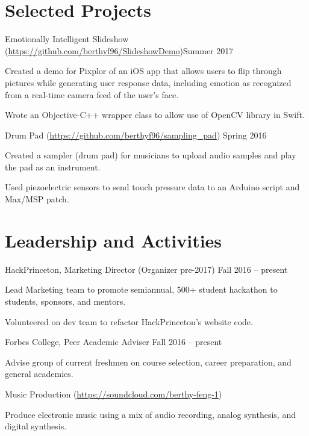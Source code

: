 \documentclass[12pt]{my_resume}
\begin{document}
\section{Selected Projects}

\begin{resitem}{Emotionally Intelligent Slideshow %
(\url{https://github.com/berthyf96/SlideshowDemo})}{Summer 2017}
  \item Created a demo for Pixplor of an iOS app that allows users to %
  flip through pictures while generating user response data, including %
  emotion as recognized from a real-time camera feed of the user’s face.
  \item Wrote an Objective-C++ wrapper class to allow use of OpenCV %
  library in Swift.
\end{resitem}

\vspace{-8pt}

\begin{resitem}{Drum Pad (\url{https://github.com/berthyf96/sampling_pad})}%
{Spring 2016}
  \item Created a sampler (drum pad) for musicians to upload audio %
  samples and play the pad as an instrument.
  \item Used piezoelectric sensors to send touch pressure data to an %
  Arduino script and Max/MSP patch.
\end{resitem}

\section{Leadership and Activities}

\begin{resitem}{HackPrinceton, Marketing Director (Organizer pre-2017)}%
{Fall 2016 -- present}
  \item Lead Marketing team to promote semiannual, 500+ student hackathon %
  to students, sponsors, and mentors.
  \item Volunteered on dev team to refactor HackPrinceton’s website code. %
\end{resitem}

\vspace{-8pt}

\begin{resitem}{Forbes College, Peer Academic Adviser}%
{Fall 2016 -- present}
  \item Advise group of current freshmen on course selection, career %
  preparation, and general academics.
\end{resitem}

\vspace{-8pt}

\begin{resitem}{Music Production %
(\url{https://soundcloud.com/berthy-feng-1})}{}
  \item Produce electronic music using a mix of audio recording, %
  analog synthesis, and digital synthesis.
\end{resitem}
\end{document}
